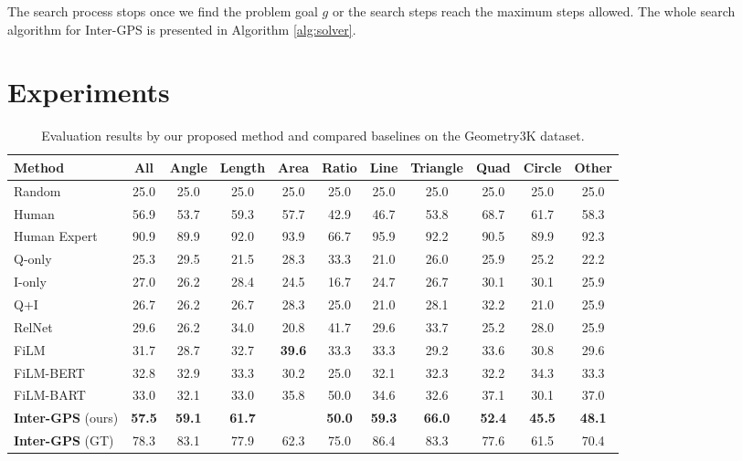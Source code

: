 \documentclass[11pt,a4paper]{article}
\begin{document}
The search process stops once we find the problem goal $g$ or the search steps reach the maximum steps allowed. The whole search algorithm for Inter-GPS is presented in Algorithm \ref{alg:solver}.



\section{Experiments}
\begin{table}[t!]
\centering 
\footnotesize
\begin{tabular}{lc|cccc|ccccc}
	\hline
	\textbf{Method} & All & Angle & Length & Area & Ratio  & Line & Triangle & Quad & Circle & Other \\
	\hline
	Random &25.0 &25.0 &25.0 &25.0 &25.0 &25.0 &25.0 &25.0 &25.0 &25.0  \\
	Human &56.9 &53.7 &59.3 &57.7 &42.9 &46.7 &53.8 &68.7 &61.7 &58.3 \\
	Human Expert &90.9 &89.9 &92.0 &93.9 &66.7 &95.9 &92.2 &90.5 &89.9 &92.3 \\
	\hline
	Q-only &25.3 &29.5 &21.5 &28.3 &33.3 &21.0 &26.0 &25.9 &25.2 &22.2 \\
	I-only &27.0 &26.2 &28.4 &24.5 &16.7 &24.7 &26.7 &30.1 &30.1 &25.9 \\
	Q+I  &26.7 &26.2 &26.7 &28.3 &25.0 &21.0 &28.1 &32.2 &21.0 &25.9 \\
	RelNet \cite{bansal2017relnet} & 29.6 &26.2 &34.0 &20.8 &41.7 &29.6 &33.7 &25.2 &28.0 &25.9 \\
	FiLM \cite{perez2018film} &31.7 &28.7 &32.7 &\textbf{39.6} &33.3 &33.3 &29.2 &33.6 &30.8 &29.6\\
	FiLM-BERT \cite{devlin2018bert} & 32.8 &32.9 &33.3 &30.2 &25.0 &32.1 &32.3 &32.2 &34.3 &33.3 \\
	FiLM-BART \cite{lewis2020bart} & 33.0 &32.1 &33.0 &35.8 &50.0 &34.6 &32.6 &37.1 &30.1 &37.0 \\
	\hline
	\textbf{Inter-GPS} (ours) & \textbf{57.5} &\textbf{59.1} &\textbf{61.7} &\text{30.2} &\textbf{50.0} &\textbf{59.3} &\textbf{66.0} &\textbf{52.4} &\textbf{45.5} &\textbf{48.1} \\
	\textbf{Inter-GPS} (GT) & 78.3 &83.1 &77.9 &62.3 &75.0 &86.4 &83.3 &77.6 &61.5 &70.4 \\
	\hline
\end{tabular}
\caption{Evaluation results by our proposed method and compared baselines on the Geometry3K dataset.}%
\label{table:result}
\end{table}
\end{document}
